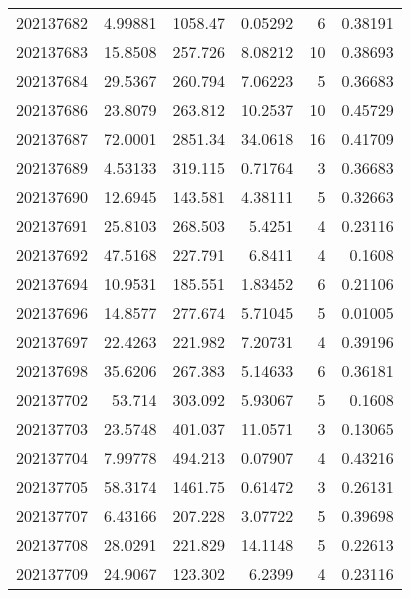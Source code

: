 \begin{tabular}{rrrrrr}
 202137682 &          4.99881 &     1058.47   &            0.05292 &           6 & 0.38191 \\
 202137683 &         15.8508  &      257.726  &            8.08212 &          10 & 0.38693 \\
 202137684 &         29.5367  &      260.794  &            7.06223 &           5 & 0.36683 \\
 202137686 &         23.8079  &      263.812  &           10.2537  &          10 & 0.45729 \\
 202137687 &         72.0001  &     2851.34   &           34.0618  &          16 & 0.41709 \\
 202137689 &          4.53133 &      319.115  &            0.71764 &           3 & 0.36683 \\
 202137690 &         12.6945  &      143.581  &            4.38111 &           5 & 0.32663 \\
 202137691 &         25.8103  &      268.503  &            5.4251  &           4 & 0.23116 \\
 202137692 &         47.5168  &      227.791  &            6.8411  &           4 & 0.1608  \\
 202137694 &         10.9531  &      185.551  &            1.83452 &           6 & 0.21106 \\
 202137696 &         14.8577  &      277.674  &            5.71045 &           5 & 0.01005 \\
 202137697 &         22.4263  &      221.982  &            7.20731 &           4 & 0.39196 \\
 202137698 &         35.6206  &      267.383  &            5.14633 &           6 & 0.36181 \\
 202137702 &         53.714   &      303.092  &            5.93067 &           5 & 0.1608  \\
 202137703 &         23.5748  &      401.037  &           11.0571  &           3 & 0.13065 \\
 202137704 &          7.99778 &      494.213  &            0.07907 &           4 & 0.43216 \\
 202137705 &         58.3174  &     1461.75   &            0.61472 &           3 & 0.26131 \\
 202137707 &          6.43166 &      207.228  &            3.07722 &           5 & 0.39698 \\
 202137708 &         28.0291  &      221.829  &           14.1148  &           5 & 0.22613 \\
 202137709 &         24.9067  &      123.302  &            6.2399  &           4 & 0.23116 \\

\end{tabular}
